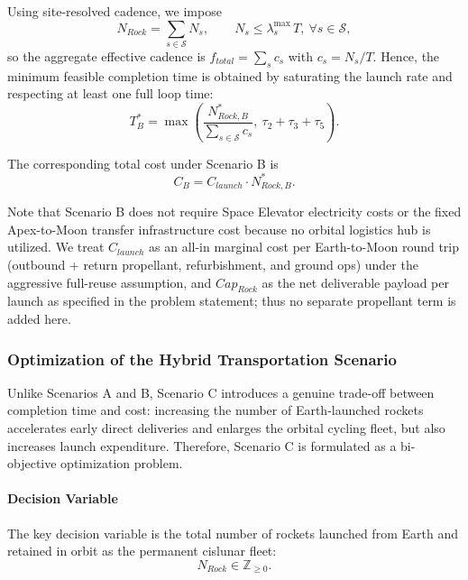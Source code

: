 ﻿\documentclass{mcmthesis}
\begin{document}
Using site-resolved cadence, we impose
\begin{equation}
N_{Rock} = \sum_{s\in\mathcal{S}} N_s,\qquad N_s \le \lambda_s^{\text{max}}\,T,\ \forall s\in\mathcal{S},
\end{equation}
so the aggregate effective cadence is $f_{total}=\sum_s c_s$ with $c_s=N_s/T$.
Hence, the minimum feasible completion time is obtained by saturating the launch
rate and respecting at least one full loop time:
\begin{equation}
T_B^{*}=\max\!\left(\frac{N_{Rock,B}^{*}}{\sum_{s\in\mathcal{S}} c_s},\ \tau_2+\tau_3+\tau_5\right).
\end{equation}

The corresponding total cost under Scenario B is
\begin{equation}
C_B =
C_{launch}\cdot N_{Rock,B}^{*}.
\end{equation}

\noindent
Note that Scenario B does not require Space Elevator electricity costs or the
fixed Apex-to-Moon transfer infrastructure cost because no orbital logistics hub
is utilized. We treat $C_{launch}$ as an all-in marginal cost per Earth-to-Moon round trip (outbound + return propellant, refurbishment, and ground ops) under the aggressive full-reuse assumption, and $Cap_{Rock}$ as the net deliverable payload per launch as specified in the problem statement; thus no separate propellant term is added here.

\subsubsection{Optimization of the Hybrid Transportation Scenario}
\label{sec:scenarioC_opt}

Unlike Scenarios A and B, Scenario C introduces a genuine trade-off between
completion time and cost: increasing the number of Earth-launched rockets
accelerates early direct deliveries and enlarges the orbital cycling fleet,
but also increases launch expenditure. Therefore, Scenario C is formulated as
a bi-objective optimization problem.

\paragraph{Decision Variable}
The key decision variable is the total number of rockets launched from Earth
and retained in orbit as the permanent cislunar fleet:
\begin{equation}
N_{Rock}\in \mathbb{Z}_{\ge 0}.
\end{equation}
\end{document}
